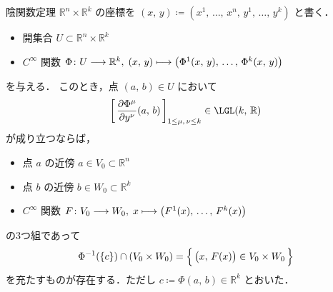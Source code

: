 \documentclass[TQFT_main]{subfiles}
\begin{document}
\begin{mycol}[label=col:implicit]{陰関数定理}
    $\mathbb{R}^n \times \mathbb{R}^k$ の座標を $(x,\, y) \coloneqq (x^1,\, \dots,\, x^n,\, y^1,\, \dots,\, y^k)$ と書く．
    \begin{itemize}
        \item 開集合 $U \subset \mathbb{R}^n \times \mathbb{R}^k$
        \item $C^\infty$ 関数 $\Phi \colon U \longrightarrow \mathbb{R}^k,\; (x,\, y) \longmapsto \bigl( \Phi^1(x,\, y),\, \dots,\, \Phi^k(x,\, y) \bigr) $
    \end{itemize}
    を与える．
    このとき，点 $(a,\, b) \in U$ において
    \begin{align}
        \left[\, \pdv{\Phi^\mu}{y^\nu}()(a,\, b) \,\right]_{1 \le \mu,\, \nu \le k} \in \LGL(k,\, \mathbb{R})
    \end{align}
    が成り立つならば，
    \begin{itemize}
        \item 点 $a$ の近傍 $a \in V_0 \subset \mathbb{R}^n$
        \item 点 $b$ の近傍 $b \in W_0 \subset \mathbb{R}^k$ 
        \item $C^\infty$ 関数 $F \colon V_0 \longrightarrow W_0,\; x \longmapsto \bigl( F^1(x),\, \dots,\, F^k(x) \bigr)$
    \end{itemize}
    の3つ組であって
    \begin{align}
        \Phi^{-1}(\{c\}) \cap (V_0 \times W_0) = \Bigl\{\, \bigl( x,\, F(x) \bigr) \in V_0 \times W_0 \,\Bigr\} 
    \end{align}
    を充たすものが存在する．ただし $c \coloneqq \Phi(a,\, b) \in \mathbb{R}^k$ とおいた．
\end{mycol}
\end{document}
